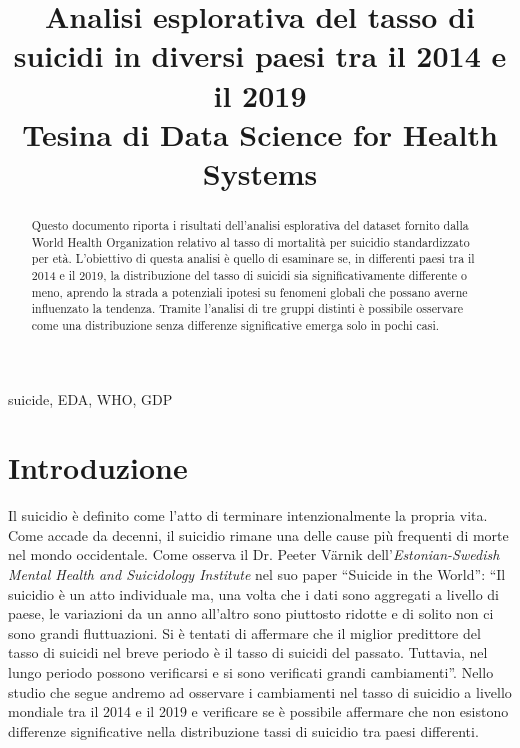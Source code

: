 \documentclass[conference]{IEEEtran}
\begin{document}
\title{Analisi esplorativa del tasso di suicidi in diversi paesi tra il 2014 e il 2019\\
{\footnotesize Tesina di Data Science for Health Systems}
}

\author{
}

\maketitle

\begin{abstract}
Questo documento riporta i risultati dell'analisi esplorativa del dataset fornito dalla
World Health Organization relativo al tasso di mortalità per suicidio standardizzato per età.
L'obiettivo di questa analisi è quello di esaminare se, in differenti paesi tra il 2014 e il 2019,
la distribuzione del tasso di suicidi sia significativamente differente o meno,
aprendo la strada a potenziali
ipotesi su fenomeni globali che possano averne influenzato la tendenza.
Tramite l'analisi di tre gruppi distinti è possibile osservare come una
distribuzione senza differenze significative emerga solo in pochi casi.
\end{abstract}

\begin{IEEEkeywords}
suicide, EDA, WHO, GDP
\end{IEEEkeywords}

\section{Introduzione}
Il suicidio è definito come l'atto di terminare intenzionalmente la propria vita\cite{b1}.
Come accade da decenni, il suicidio rimane una delle cause più
frequenti di morte nel mondo occidentale\cite{b2}.
Come osserva il Dr. Peeter V\"arnik dell'\emph{Estonian-Swedish Mental Health
and Suicidology Institute} nel suo paper ``Suicide in the World''\cite{b3}:
``Il suicidio è un atto individuale ma, una volta che i dati sono aggregati a
livello di paese, le variazioni da un anno all'altro sono piuttosto ridotte e
di solito non ci sono grandi fluttuazioni. Si è tentati di affermare che
il miglior predittore del tasso di suicidi nel breve periodo è il tasso di suicidi del passato.
Tuttavia, nel lungo periodo possono verificarsi e si sono verificati grandi cambiamenti''.
Nello studio che segue andremo ad osservare i cambiamenti nel tasso di suicidio 
a livello mondiale tra il 2014 e il 2019 e verificare se è possibile affermare
che non esistono differenze significative nella distribuzione tassi di suicidio
tra paesi differenti.
\end{document}
